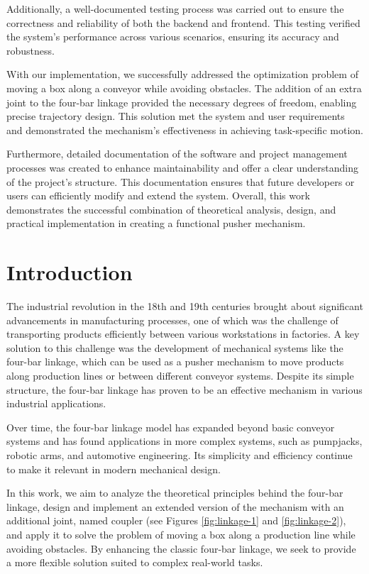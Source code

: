 \documentclass{article}
\begin{document}
Additionally, a well-documented testing process was carried out to ensure the correctness and reliability of both the backend and frontend. This testing verified the system's performance across various scenarios, ensuring its accuracy and robustness.

With our implementation, we successfully addressed the optimization problem of moving a box along a conveyor while avoiding obstacles. The addition of an extra joint to the four-bar linkage provided the necessary degrees of freedom, enabling precise trajectory design. This solution met the system and user requirements and demonstrated the mechanism's effectiveness in achieving task-specific motion.

Furthermore, detailed documentation of the software and project management processes was created to enhance maintainability and offer a clear understanding of the project’s structure. This documentation ensures that future developers or users can efficiently modify and extend the system. Overall, this work demonstrates the successful combination of theoretical analysis, design, and practical implementation in creating a functional pusher mechanism.

\clearpage

\section{Introduction}

The industrial revolution in the 18th and 19th centuries brought about significant advancements in manufacturing processes, one of which was the challenge of transporting products efficiently between various workstations in factories. A key solution to this challenge was the development of mechanical systems like the four-bar linkage, which can be used as a pusher mechanism to move products along production lines or between different conveyor systems. Despite its simple structure, the four-bar linkage has proven to be an effective mechanism in various industrial applications. 

Over time, the four-bar linkage model has expanded beyond basic conveyor systems and has found applications in more complex systems, such as pumpjacks, robotic arms, and automotive engineering. Its simplicity and efficiency continue to make it relevant in modern mechanical design.

In this work, we aim to analyze the theoretical principles behind the four-bar linkage, design and implement an extended version of the mechanism with an additional joint, named coupler (see Figures \ref{fig:linkage-1} and \ref{fig:linkage-2}), and apply it to solve the problem of moving a box along a production line while avoiding obstacles. By enhancing the classic four-bar linkage, we seek to provide a more flexible solution suited to complex real-world tasks.
\end{document}
